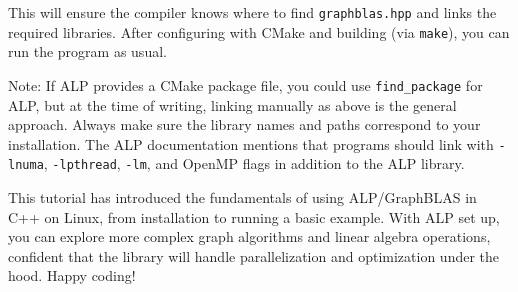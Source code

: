 This will ensure the compiler knows where to find \texttt{graphblas.hpp} and links the required libraries. After configuring with CMake and building (via \texttt{make}), you can run the program as usual.

\vspace{1ex}

Note: If ALP provides a CMake package file, you could use \texttt{find\_package} for ALP, but at the time of writing, linking manually as above is the general approach. Always make sure the library names and paths correspond to your installation. The ALP documentation mentions that programs should link with \texttt{-lnuma}, \texttt{-lpthread}, \texttt{-lm}, and OpenMP flags in addition to the ALP library.

\bigskip

This tutorial has introduced the fundamentals of using ALP/GraphBLAS in C++ on Linux, from installation to running a basic example. With ALP set up, you can explore more complex graph algorithms and linear algebra operations, confident that the library will handle parallelization and optimization under the hood. Happy coding!

